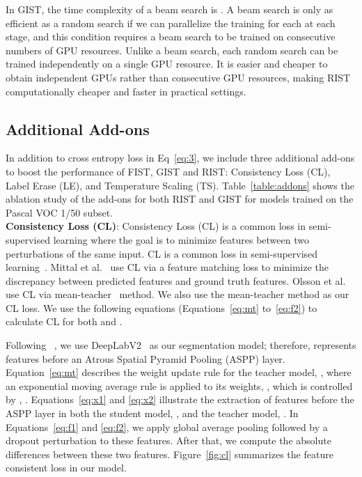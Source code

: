 \documentclass[10pt, conference, compsocconf]{IEEEtran}
\begin{document}
In GIST, the time complexity of a beam search is . A beam search is only as efficient as a random search if we can parallelize the training for each  at each stage, and this condition requires a beam search to be trained on consecutive numbers of GPU resources. Unlike a beam search, each random search can be trained independently on a single GPU resource. It is easier and cheaper to obtain  independent GPUs rather than  consecutive GPU resources, making RIST computationally cheaper and faster in practical settings.

\subsection{Additional Add-ons}

In addition to cross entropy loss in Eq~\ref{eq:3}, we include three additional add-ons to boost the performance of FIST, GIST and RIST: Consistency Loss (CL), Label Erase (LE), and Temperature Scaling (TS).
Table~\ref{table:addons} shows the ablation study of the add-ons for both RIST and GIST for models trained on the Pascal VOC 1/50 subset. \\


\noindent\textbf{Consistency Loss (CL)}:
Consistency Loss (CL) is a common loss in semi-supervised learning where the goal is to minimize features between two perturbations of the same input. 
CL is a common loss in semi-supervised learning~\cite{mittal2019semi,olsson2020classmix}. Mittal et al.~\cite{mittal2019semi} use CL via a feature matching loss to minimize the discrepancy between predicted features and ground truth features. Olsson et al.~\cite{mittal2019semi} use CL via mean-teacher~\cite{tarvainen2017mean} method. We also use the mean-teacher method as our CL loss.
We use the following equations (Equations~\ref{eq:mt} to~\ref{eq:f2}) to calculate CL for both  and . 

\setcounter{equation}{2}


Following ~\cite{mittal2019semi,hung2019adversarial}, we use DeepLabV2~\cite{chen2017deeplab} as our segmentation model; therefore,  represents features before an Atrous Spatial Pyramid Pooling (ASPP) layer. Equation~\ref{eq:mt} describes the weight update rule for the teacher model, , where an exponential moving average rule is applied to its weights, , which is controlled by , .
Equations~\ref{eq:x1} and \ref{eq:x2} illustrate the extraction of features before the ASPP layer in both the student model, , and the teacher model, . In Equations~\ref{eq:f1} and \ref{eq:f2}, we apply global average pooling followed by a dropout perturbation to these features. After that, we compute the absolute differences between these two features.
Figure~\ref{fig:cl} summarizes the feature consistent loss in our model. \\
\end{document}
